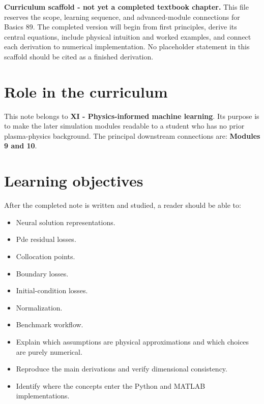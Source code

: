 \documentclass[11pt]{article}
\begin{document}

\begin{overviewbox}
\textbf{Curriculum scaffold - not yet a completed textbook chapter.} This file reserves the scope, learning sequence, and advanced-module connections for Basics 89. The completed version will begin from first principles, derive its central equations, include physical intuition and worked examples, and connect each derivation to numerical implementation. No placeholder statement in this scaffold should be cited as a finished derivation.
\end{overviewbox}

\ProjectTOC

\section{Role in the curriculum}
This note belongs to \textbf{XI - Physics-informed machine learning}. Its purpose is to make the later simulation modules readable to a student who has no prior plasma-physics background. The principal downstream connections are: \textbf{Modules 9 and 10}.

\section{Learning objectives}
After the completed note is written and studied, a reader should be able to:
\begin{itemize}[leftmargin=1.6em]
\item Neural solution representations.
\item Pde residual losses.
\item Collocation points.
\item Boundary losses.
\item Initial-condition losses.
\item Normalization.
\item Benchmark workflow.
\item Explain which assumptions are physical approximations and which choices are purely numerical.
\item Reproduce the main derivations and verify dimensional consistency.
\item Identify where the concepts enter the Python and MATLAB implementations.
\end{itemize}
\end{document}
